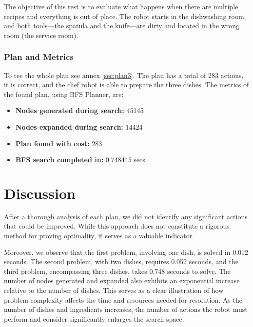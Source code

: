 \documentclass[a4paper,12pt]{article}
\begin{document}
The objective of this test is to evaluate what happens when there are multiple recipes and everything is out of place. The robot starts in the dishwashing room, and both tools—the spatula and the knife—are dirty and located in the wrong room (the service room).

\subsubsection{Plan and Metrics}
To tee the whole plan see annex \ref{sec:plan3}. The plan has a total of 283 actions, it is correct, and the chef robot is able to prepare the three dishes. The metrics of the found plan, using BFS Planner, are:

\begin{itemize}
    \item \textbf{Nodes generated during search:} 45145
    \item \textbf{Nodes expanded during search:} 14424
    \item \textbf{Plan found with cost:} 283
    \item \textbf{BFS search completed in:} 0.748445 secs
\end{itemize}

\section{Discussion}
\label{sec:discussion}
After a thorough analysis of each plan, we did not identify any significant actions that could be improved. While this approach does not constitute a rigorous method for proving optimality, it serves as a valuable indicator.

Moreover, we observe that the first problem, involving one dish, is solved in 0.012 seconds. The second problem, with two dishes, requires 0.052 seconds, and the third problem, encompassing three dishes, takes 0.748 seconds to solve. The number of nodes generated and expanded also exhibits an exponential increase relative to the number of dishes. This serves as a clear illustration of how problem complexity affects the time and resources needed for resolution. As the number of dishes and ingredients increases, the number of actions the robot must perform and consider significantly enlarges the search space.
\end{document}
